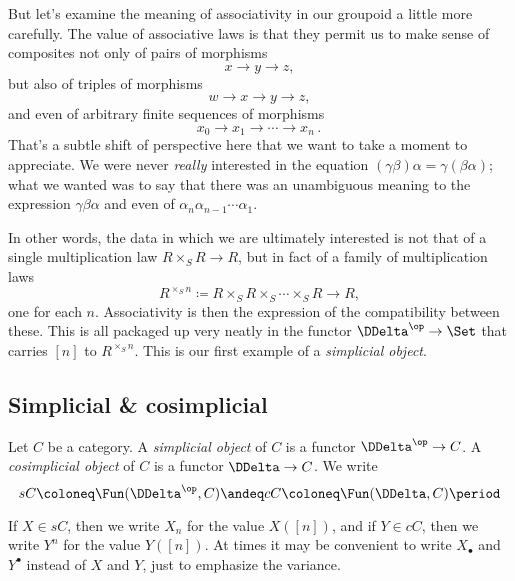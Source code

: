 But let's examine the meaning of associativity in our groupoid a little more carefully.
The value of associative laws is that they permit us to make sense of composites not only of pairs of morphisms
\[
  x \to y \to z \comma
\]
but also of triples of morphisms
\[
  w \to x \to y \to z \comma
\]
and even of arbitrary finite sequences of morphisms
\[
  x_0 \to x_1 \to \cdots \to x_n \period
\]
That's a subtle shift of perspective here that we want to take a moment to appreciate.
We were never \emph{really} interested in the equation $(\gamma\beta)\alpha = \gamma(\beta\alpha)$;
what we wanted was to say that there was an unambiguous meaning to the expression $\gamma\beta\alpha$ and even of $\alpha_n \alpha_{n-1} \cdots \alpha_1$.

In other words, the data in which we are ultimately interested is not that of a single multiplication law $R \times_S R \to R$, but in fact of a family of multiplication laws
\[
  R^{\times_S n} \coloneq R \times_S R \times_S \cdots \times_S R \to R \comma
\]
one for each $n$.
Associativity is then the expression of the compatibility between these.
This is all packaged up very neatly in the functor $\DDelta^{\op} \to \Set$ that carries $[n]$ to $R^{\times_S n}$. 
This is our first example of a \emph{simplicial object}.

\subsection{Simplicial \& cosimplicial}%
\label{sub:simplicialcosimplicial}

\begin{definition}
  Let $C$ be a category.
  A \emph{simplicial object} of $C$ is a functor $\DDelta^{\op}\to C$.
  A \emph{cosimplicial object} of $C$ is a functor $\DDelta \to C$.
  We write
  \[
    sC \coloneq \Fun(\DDelta^{\op},C)
    \andeq
    cC \coloneq \Fun(\DDelta, C) \period
  \]

  If $X \in sC$, then we write $X_n$ for the value $X([n])$, and
  if $Y \in cC$, then we write $Y^n$ for the value $Y([n])$.
  At times it may be convenient to write $X_\bullet$ and $Y^\bullet$ instead of $X$ and $Y$, just to emphasize the variance.
\end{definition}

